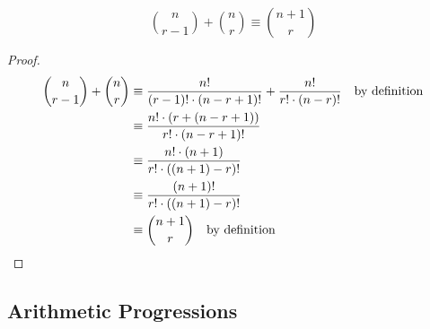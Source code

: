 \begin{lemma} \label{lem_bin_coef_sum}
 \begin{equation*}
  \binom n{r - 1} + \binom nr \equiv \binom{n + 1} r
 \end{equation*}
\end{lemma}
\begin{proof}
 \begin{align*}
  \binom n{r - 1} + \binom nr &\equiv \frac{n!}{(r - 1)! \cdot (n - r + 1)!}
                                   + \frac{n!}{r! \cdot (n - r)!}
                                      \quad \text{by definition} \\
      &\equiv \frac{n!\cdot(r + (n - r + 1))}{r! \cdot (n - r + 1)!} \\
      &\equiv \frac{n! \cdot (n + 1)}{r! \cdot ((n + 1) - r)!} \\
      &\equiv \frac{(n + 1)!}{r! \cdot ((n + 1) - r)!} \\
      &\equiv \binom{n + 1} r \quad \text{by definition} \qedhere
 \end{align*}
\end{proof}

\subsection{Arithmetic Progressions} \label{sec_seq_AP}

